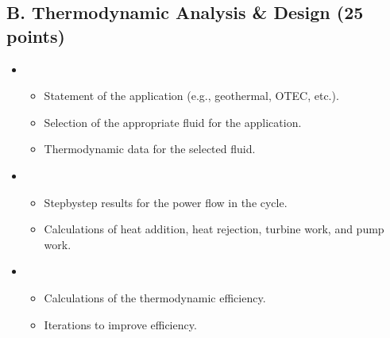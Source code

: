 \documentclass[letterpaper,10pt,english]{jupyterBook}
\begin{document}
\subsection{B. Thermodynamic Analysis \& Design (25 points)}
\label{\detokenize{ProjectSyllabus:b-thermodynamic-analysis-design-25-points}}\begin{itemize}
\item {} 
\sphinxAtStartPar
{}
\begin{itemize}
\item {} 
\sphinxAtStartPar
Statement of the application (e.g., geothermal, OTEC, etc.).

\item {} 
\sphinxAtStartPar
Selection of the appropriate fluid for the application.

\item {} 
\sphinxAtStartPar
Thermodynamic data for the selected fluid.

\end{itemize}

\item {} 
\sphinxAtStartPar
{}
\begin{itemize}
\item {} 
\sphinxAtStartPar
Step\sphinxhyphen{}by\sphinxhyphen{}step results for the power flow in the cycle.

\item {} 
\sphinxAtStartPar
Calculations of heat addition, heat rejection, turbine work, and pump work.

\end{itemize}

\item {} 
\sphinxAtStartPar
{}
\begin{itemize}
\item {} 
\sphinxAtStartPar
Calculations of the thermodynamic efficiency.

\item {} 
\sphinxAtStartPar
Iterations to improve efficiency.

\end{itemize}

\end{itemize}
\end{document}
